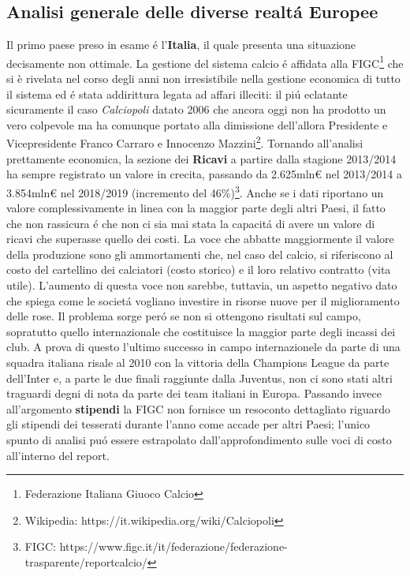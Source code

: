 \documentclass[
    corpo=12pt,
    oneside,
    evenboxes,
    tipotesi=triennale,
    stile=classica,
    oldstyle,
    autoretitolo,
    greek,
]{toptesi}
\begin{document}
\begin{interlinea}{1.5}
\section{Analisi generale delle diverse realt\'a Europee}
Il primo paese preso in esame \'e l'\textbf{Italia}, il quale presenta una situazione decisamente non ottimale. La gestione del sistema calcio 
\'e affidata alla FIGC\footnote{Federazione Italiana Giuoco Calcio} che si è rivelata nel corso degli anni non irresistibile nella gestione economica
di tutto il sistema ed \'e stata addirittura legata ad affari illeciti: il pi\'u eclatante sicuramente il caso \emph{Calciopoli} 
datato 2006 che ancora oggi non ha prodotto un vero colpevole ma ha comunque portato alla dimissione dell'allora Presidente e 
Vicepresidente Franco Carraro e Innocenzo Mazzini\footnote{Wikipedia: https://it.wikipedia.org/wiki/Calciopoli}.
Tornando all'analisi prettamente economica, la sezione dei \textbf{Ricavi} a partire dalla stagione 2013/2014 ha sempre registrato un valore 
in crecita, passando da 2.625mln€ nel 2013/2014 a 3.854mln€ nel 2018/2019 (incremento del 46\%)\footnote{FIGC: https://www.figc.it/it/federazione/federazione-trasparente/reportcalcio/}. 
Anche se i dati riportano un valore complessivamente in linea con la maggior parte degli altri Paesi, il fatto che non rassicura \'e che non
ci sia mai stata la capacit\'a di avere un valore di ricavi che superasse quello dei costi. La voce che abbatte maggiormente il valore 
della produzione sono gli ammortamenti che, nel caso del calcio, 
si riferiscono al costo del cartellino dei calciatori (costo storico) e il loro relativo contratto (vita utile). L'aumento di questa voce
non sarebbe, tuttavia, un aspetto negativo dato che spiega come le societ\'a vogliano investire in risorse nuove per il miglioramento delle
rose. Il problema sorge per\'o se non si ottengono risultati sul campo, sopratutto quello internazionale che costituisce la maggior parte
degli incassi dei club. A prova di questo l'ultimo successo in campo 
internazionele da parte di una squadra italiana risale al 2010 con la vittoria della Champions League da parte dell'Inter e, a parte
le due finali raggiunte dalla Juventus, non ci sono stati altri traguardi degni di nota da parte dei team italiani in Europa.\newline
Passando invece all'argomento \textbf{stipendi} la FIGC non fornisce un resoconto dettagliato riguardo gli stipendi dei tesserati durante l'anno
come accade per altri Paesi; l'unico spunto di analisi pu\'o essere estrapolato dall'approfondimento sulle voci di costo all'interno del report.

\end{interlinea}
\end{document}
